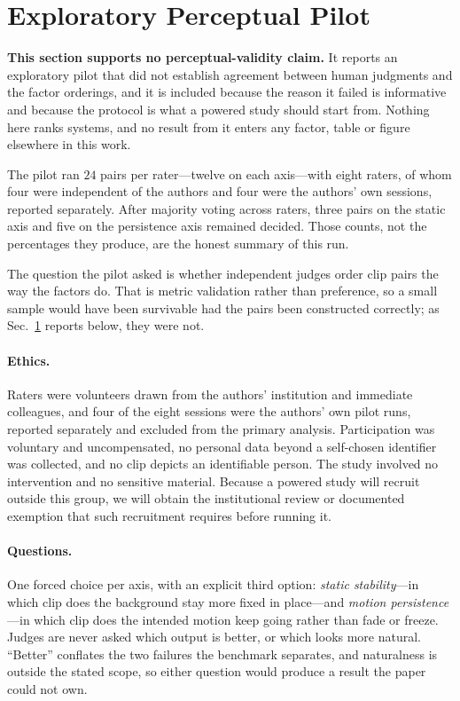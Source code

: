 \documentclass[10pt,twocolumn,letterpaper]{article}
\begin{document}


\section{Exploratory Perceptual Pilot}
\label{sup:perceptual}

\textbf{This section supports no perceptual-validity claim.} It reports an
exploratory pilot that did not establish agreement between human judgments and
the factor orderings, and it is included because the reason it failed is
informative and because the protocol is what a powered study should start from.
Nothing here ranks systems, and no result from it enters any factor, table or
figure elsewhere in this work.

The pilot ran $24$ pairs per rater---twelve on each axis---with eight raters, of
whom four were independent of the authors and four were the authors' own
sessions, reported separately. After majority voting across raters, three pairs
on the static axis and five on the persistence axis remained decided. Those
counts, not the percentages they produce, are the honest summary of this run.

The question the pilot asked is whether independent judges order clip pairs the
way the factors do. That is metric validation rather than preference, so a small
sample would have been survivable had the pairs been constructed correctly; as
Sec.~\ref{sup:perceptual} reports below, they were not.

\paragraph{Ethics.}
Raters were volunteers drawn from the authors' institution and immediate
colleagues, and four of the eight sessions were the authors' own pilot runs,
reported separately and excluded from the primary analysis. Participation was
voluntary and uncompensated, no personal data beyond a self-chosen identifier
was collected, and no clip depicts an identifiable person. The study involved
no intervention and no sensitive material. Because a powered study will recruit
outside this group, we will obtain the institutional review or documented
exemption that such recruitment requires before running it.

\paragraph{Questions.}
One forced choice per axis, with an explicit third option:
\emph{static stability}---in which clip does the background stay more fixed in
place---and \emph{motion persistence}---in which clip does the intended motion
keep going rather than fade or freeze. Judges are never asked which output is
better, or which looks more natural. ``Better'' conflates the two failures the
benchmark separates, and naturalness is outside the stated scope, so either
question would produce a result the paper could not own.
\end{document}
